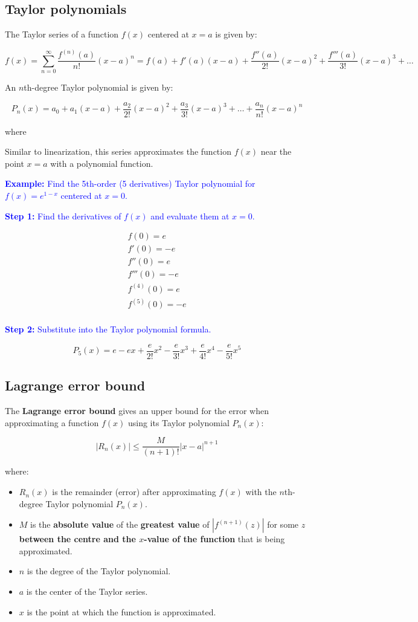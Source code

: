 \documentclass[letterpaper, 12pt]{article}
\newcommand{\example}[1]{\textcolor{blue}{\textbf{Example:} #1}}
\newcommand{\step}[2]{\textcolor{blue}{\textbf{Step #1:} #2}}
\begin{document}
\subsection*{Taylor polynomials}

The Taylor series of a function $f(x)$ centered at $x = a$ is given by:

$$f(x) = \sum_{n=0}^\infty \frac{f^{(n)}(a)}{n!} (x-a)^n = f(a) + f'(a)(x-a) + \frac{f''(a)}{2!}(x-a)^2 + \frac{f'''(a)}{3!}(x-a)^3 + \dots$$

An $n$th-degree Taylor polynomial is given by:

$$P_n(x) = a_0 + a_1(x-a) + \frac{a_2}{2!}(x-a)^2 + \frac{a_3}{3!}(x-a)^3 + \dots + \frac{a_n}{n!}(x-a)^n$$

where

Similar to linearization, this series approximates the function $f(x)$ near the point $x = a$ with a polynomial function. 

\example{Find the 5th-order (5 derivatives) Taylor polynomial for $f(x) = e^{1-x}$ centered at $x = 0$.}

\step{1}{Find the derivatives of $f(x)$ and evaluate them at $x = 0$.}

\begin{gather*}
f(0) = e \\
f'(0) = -e \\
f''(0) = e \\
f'''(0) = -e \\
f^{(4)}(0) = e \\
f^{(5)}(0) = -e \\
\end{gather*}

\step{2}{Substitute into the Taylor polynomial formula.}

$$P_5(x) = e - ex + \frac{e}{2!} x^2 - \frac{e}{3!} x^3 + \frac{e}{4!} x^4 - \frac{e}{5!} x^5$$

\subsection*{Lagrange error bound}

The \textbf{Lagrange error bound} gives an upper bound for the error when approximating a function $f(x)$ using its Taylor polynomial $P_n(x)$:

$$|R_n(x)| \leq \frac{M}{(n+1)!} |x-a|^{n+1}$$

where:

\begin{itemize}
    \item $R_n(x)$ is the remainder (error) after approximating $f(x)$ with the $n$th-degree Taylor polynomial $P_n(x)$.
    \item $M$ is the \textbf{absolute value} of the \textbf{greatest value} of $|f^{(n+1)}(z)|$ for some $z$ \textbf{between the centre and the $x$-value of the function} that is being approximated.
    \item $n$ is the degree of the Taylor polynomial.
    \item $a$ is the center of the Taylor series.
    \item $x$ is the point at which the function is approximated.
\end{itemize}
\end{document}
